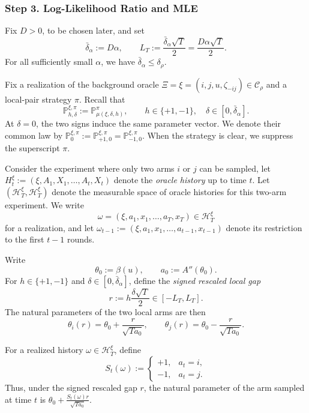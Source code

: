 \documentclass[10pt]{article}
\theoremstyle{plain}
\begin{document}


\subsubsection{Step 3. Log-Likelihood Ratio and MLE}

Fix $D>0$, to be chosen later, and set
\[
    \bar\delta_\alpha:=D\alpha,
    \qquad
    L_T:=\frac{\bar\delta_\alpha\sqrt T}{2}
    =
    \frac{D\alpha\sqrt T}{2}.
\]
For all sufficiently small $\alpha$, we have
$\bar\delta_\alpha\le\delta_\rho$.

Fix a realization of the background oracle
$\Xi=\xi=(i,j,u,\zeta_{-ij})\in\mathcal C_\rho$ and a local-pair strategy
$\pi$. Recall that
\[
    \mathbb P_{h,\delta}^{\xi,\pi}
    :=
    \mathbb P_{\mu(\xi,\delta,h)}^\pi,
    \qquad
    h\in\{+1,-1\},
    \quad
    \delta\in[0,\bar\delta_\alpha].
\]
At $\delta=0$, the two signs induce the same parameter vector. We denote
their common law by
    $\mathbb P_0^{\xi,\pi}
    :=
    \mathbb P_{+1,0}^{\xi,\pi}
    =
    \mathbb P_{-1,0}^{\xi,\pi}$.
When the strategy is clear, we suppress the superscript $\pi$.

Consider the experiment where only two arms $i$ or $j$ can be sampled, let
    $H_t^\xi
    :=
    (\xi,A_1,X_1,\ldots,A_t,X_t)$
denote the \emph{oracle history} up to time $t$.
Let $(\mathcal H_T^\xi,\mathscr H_T^\xi)$ denote the measurable space of oracle histories for this two-arm experiment. We write
\[
    \omega
    =
    (\xi,a_1,x_1,\ldots,a_T,x_T)
    \in\mathcal H_T^\xi
\]
for a realization, and let
    $\omega_{t-1}
    :=
    (\xi,a_1,x_1,\ldots,a_{t-1},x_{t-1})$
denote its restriction to the first $t-1$ rounds.

Write
\[
    \theta_0:=\beta(u),
    \qquad
    a_0:=A''(\theta_0).
\]
For $h\in\{+1,-1\}$ and
$\delta\in[0,\bar\delta_\alpha]$, define the \emph{signed rescaled local gap}
    $$r:=h\frac{\delta\sqrt T}{2}
    \in[-L_T,L_T].$$
The natural parameters of the two local arms are then
\[
    \theta_i(r)
    =
    \theta_0+\frac{r}{\sqrt{Ta_0}},
    \qquad
    \theta_j(r)
    =
    \theta_0-\frac{r}{\sqrt{Ta_0}}.
\]

For a realized history $\omega\in\mathcal H_T^\xi$, define
\[
    S_t(\omega)
    :=
    \begin{cases}
        +1, & a_t=i,\\
        -1, & a_t=j.
    \end{cases}
\]
Thus, under the signed rescaled gap $r$, the natural parameter of the arm
sampled at time $t$ is
    $\theta_0+\frac{S_t(\omega)r}{\sqrt{Ta_0}}$.
\end{document}
